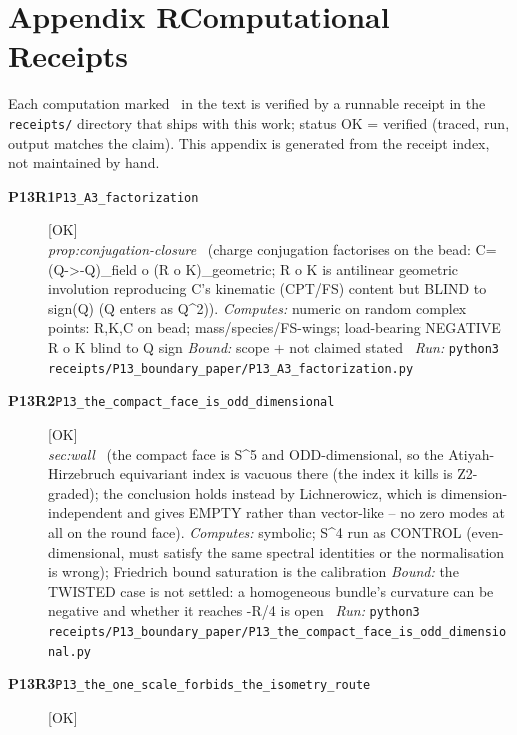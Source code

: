\clearpage
\section*{Appendix R\quad Computational Receipts}\label{app:receipts}
\small\noindent Each computation marked \rcptmarker\ in the text is verified by a runnable receipt in the \texttt{receipts/} directory that ships with this work; status \textsf{OK} = verified (traced, run, output matches the claim). This appendix is generated from the receipt index, not maintained by hand.\par\medskip
\begingroup\renewcommand{\arraystretch}{1.25}
\begin{description}
\item[\textbf{P13R1}\quad\texttt{P13\_A3\_factorization}]\hfill\textsf{[OK]}\\
\textit{prop:conjugation-closure} \ (charge conjugation factorises on the bead: C=(Q->-Q)\_field o (R o K)\_geometric; R o K is antilinear geometric involution reproducing C's kinematic (CPT/FS) content but BLIND to sign(Q) (Q enters as Q\textasciicircum{}2)). 
\emph{Computes:} numeric on random complex points: R,K,C on bead; \textbar{}mass\textbar{}/species/FS-wings; load-bearing NEGATIVE R o K blind to Q sign
 \emph{Bound:} scope + not claimed stated
\ \emph{Run:} \texttt{python3 receipts/P13\_boundary\_paper/P13\_A3\_factorization.py}
\item[\textbf{P13R2}\quad\texttt{P13\_the\_compact\_face\_is\_odd\_dimensional}]\hfill\textsf{[OK]}\\
\textit{sec:wall} \ (the compact face is S\textasciicircum{}5 and ODD-dimensional, so the Atiyah-Hirzebruch equivariant index is vacuous there (the index it kills is Z2-graded); the conclusion holds instead by Lichnerowicz, which is dimension-independent and gives EMPTY rather than vector-like -- no zero modes at all on the round face). 
\emph{Computes:} symbolic; S\textasciicircum{}4 run as CONTROL (even-dimensional, must satisfy the same spectral identities or the normalisation is wrong); Friedrich bound saturation is the calibration
 \emph{Bound:} the TWISTED case is not settled: a homogeneous bundle's curvature can be negative and whether it reaches -R/4 is open
\ \emph{Run:} \texttt{python3 receipts/P13\_boundary\_paper/P13\_the\_compact\_face\_is\_odd\_dimensional.py}
\item[\textbf{P13R3}\quad\texttt{P13\_the\_one\_scale\_forbids\_the\_isometry\_route}]\hfill\textsf{[OK]}\\

\end{description}
